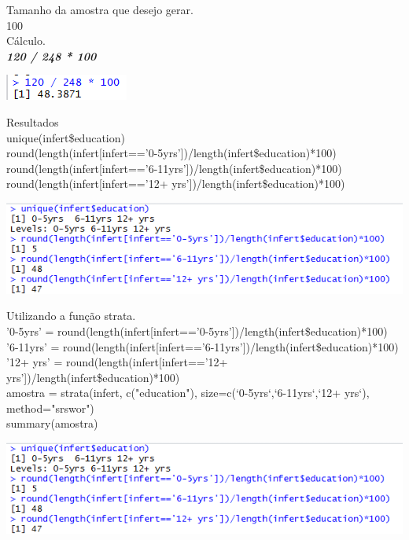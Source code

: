 Tamanho da amostra que desejo gerar.
\\100\\

Cálculo.
\\
\textbf{\textit{120 / 248 * 100}}

{\centering \includegraphics[scale=1.0]{cap1/Amostragem/amostragemEstratificadaR2Infert4.png} \par}

\newpage

Resultados
\\unique(infert\$education)
\\round(length(infert[infert=='0-5yrs'])/length(infert\$education)*100)
\\round(length(infert[infert=='6-11yrs'])/length(infert\$education)*100)
\\round(length(infert[infert=='12+ yrs'])/length(infert\$education)*100)\\

{\centering \includegraphics[scale=0.8]{cap1/Amostragem/amostragemEstratificadaR2Infert5.png} \par}

Utilizando a função strata.
\\'0-5yrs' = round(length(infert[infert=='0-5yrs'])/length(infert\$education)*100)
\\'6-11yrs' = round(length(infert[infert=='6-11yrs'])/length(infert\$education)*100)
\\'12+ yrs' = round(length(infert[infert=='12+ yrs'])/length(infert\$education)*100)
\\amostra = strata(infert, c("education"), size=c(`0-5yrs`,`6-11yrs`,`12+ yrs`), method="srswor")
\\summary(amostra)\\

{\centering \includegraphics[scale=0.8]{cap1/Amostragem/amostragemEstratificadaR2Infert5.png} \par}

